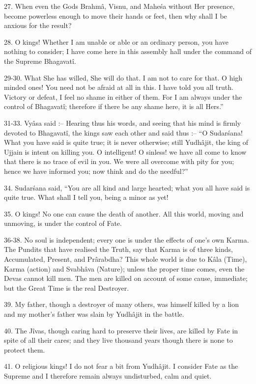 27. When even the Gods Brahm\^a, Visnu, and Mahe\'sa without Her presence, become powerless enough to move their hands or feet, then why shall I be anxious for the result?

28. O kings! Whether I am unable or able or an ordinary person, you have nothing to consider; I have come here in this assembly hall under the command of the Supreme Bhagavat\^i.

29-30. What She has willed, She will do that. I am not to care for that. O high minded ones! You need not be afraid at all in this. I have told you all truth. Victory or defeat, I feel no shame in either of them. For I am always under the control of Bhagavat\^i; therefore if there be any shame here, it is all Hers.''

31-33. Vy\^asa said :-- Hearing thus his words, and seeing that his mind is firmly devoted to Bhagavat\^i, the kings saw each other and said thus :-- ``O Sudar\'sana! What you have said is quite true; it is never otherwise; still Yudh\^ajit, the king of Ujjain is intent on killing you. O intelligent! O sinless! we have all come to know that there is no trace of evil in you. We were all overcome with pity for you; hence we have informed you; now think and do the needful?''

34. Sudar\'sana said, ``You are all kind and large hearted; what you all have said is quite true. What shall I tell you, being a minor as yet!

35. O kings! No one can cause the death of another. All this world, moving and unmoving, is under the control of Fate.

36-38. No soul is independent; every one is under the effects of one's own Karma. The Pundits that have realised the Truth, say that Karma is of three kinds, Accumulated, Present, and Pr\^arabdha? This whole world is due to K\^ala (Time), Karma (action) and Svabh\^ava (Nature); unless the proper time comes, even the Devas cannot kill men. The men are killed on account of some cause, immediate; but the Great Time is the real Destroyer.

39. My father, though a destroyer of many others, was himself killed by a lion and my mother's father was slain by Yudh\^ajit in the battle.

40. The J\^ivas, though caring hard to preserve their lives, are killed by Fate in spite of all their cares; and they live thousand years though there is none to protect them.

41. O religious kings! I do not fear a bit from Yudh\^ajit. I consider Fate as the Supreme and I therefore remain always undisturbed, calm and quiet.

